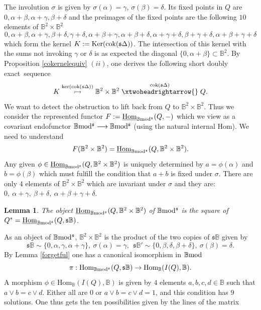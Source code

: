 \documentclass[12pt]{article}
\newtheorem{lem}[thm]{Lemma}
\def\Hom{{\rm Hom}}
\def\Homi{{\underline{\rm Hom}}}
\def\sker{{\rm ker}}
\def\scoker{{\rm cok}}
\def\B{{\mathbb B}}
\def\exxx{{doubly exact}~}
\def\ker{{\mbox{Ker}}}
\def\Hom {{\mbox{Hom}}}
\def\yb{\mathfrak{s}}
\def\bmod{{\rm \B mod}}
\def\b2{{\rm \B mod^{\mathfrak s}}}
\begin{document}
The involution $\sigma$ is given by  $\sigma(\alpha)=\gamma$, $\sigma(\beta)=\delta$. Its fixed points in $Q$ are 
$
0,\alpha +\beta,\alpha +\gamma,\beta +\delta
$
and the preimages of the fixed points are the following $10$ elements of $\B^2\times \B^2$
$$
0,\alpha +\beta,\alpha +\gamma,\beta +\delta,\gamma +\delta ,\alpha +\beta +\gamma ,\alpha +\beta +\delta ,\alpha +\gamma +\delta ,\beta +\gamma +\delta ,\alpha +\beta +\gamma +\delta 
$$
which form the kernel $K:=\ker(\scoker(\yb\Delta))$. The intersection of this kernel with the sums not invoking $\gamma$ or $\delta$ is as expected the diagonal $\{0,\alpha +\beta\}\subset \B^2$. By Proposition \ref{cokernelequiv} $(ii)$, one derives the following short \exxx sequence 
\begin{equation}\label{short diag exact}
	K\stackrel{\sker(\scoker(\yb\Delta))}{\rightarrowtail} \B^2\times \B^2\stackrel{\scoker(\yb\Delta)}{\xtwoheadrightarrow{}}Q.
\end{equation}
We want to detect the obstruction to lift back from $Q$ to $\B^2\times \B^2$. Thus we  consider the represented functor $F:=\Homi_\b2(Q,-)$ which we view as a covariant endofunctor $\b2\longrightarrow\b2$ (using the natural internal Hom). We need to understand 
$$
F(\B^2\times \B^2)=\Homi_\b2(Q,\B^2\times \B^2).
$$
Any given $\phi \in \Homi_\b2(Q,\B^2\times \B^2)$ is uniquely determined by $a=\phi(\alpha)$ and $b=\phi(\beta)$ which must fulfill the condition that $a+b$ is fixed under $\sigma$.
There are only $4$ elements of $\B^2\times \B^2$ which are invariant under $\sigma$ and they are: 
$
0, \ \alpha+\gamma, \ \beta+\delta, \ \alpha +\beta +\gamma +\delta 
$.
\begin{lem}\label{cokernel of diag} The object $\Homi_\b2(Q,\B^2\times \B^2)$ of $\b2$ is the square of $Q^*=\Homi_\b2(Q,\yb\B)$.
\end{lem}
\proof As an object of $\b2$, $\B^2\times \B^2$ is the product of the two copies of $\yb\B$ given by 
$$
\yb\B\sim \{0,\alpha ,\gamma,\alpha +\gamma\},\ \sigma(\alpha)=\gamma,\ \ 
\yb\B'\sim \{0,\beta ,\delta,\beta +\delta\},\ \sigma(\beta)=\delta.
$$
\endproof
By Lemma \ref{forgetful} one has a canonical isomorphism in $\bmod$ 
\begin{equation}\label{canonicalisobis}
\pi:\Hom_\b2(Q,\yb\B)\to \Hom_\B(I(Q),\B).
\end{equation}
A morphism $\phi\in \Hom_\B(I(Q),\B)$ is given by $4$ elements $a,b,c,d\in \B$ such that $a\vee b=c\vee d$. Either all are $0$ or $a\vee b=c\vee d=1$, and this condition has $9$ solutions. One thus gets the ten possibilities given by the lines of the matrix
\end{document}
